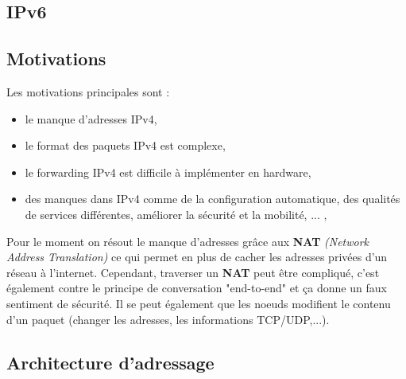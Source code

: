 \documentclass{article}
\begin{document}
\begin{sffamily}
\section{IPv6}

\subsection{Motivations}

Les motivations principales sont :
\begin{itemize}
\item le manque d'adresses IPv4,
\item le format des paquets IPv4 est complexe,
\item le forwarding IPv4 est difficile à implémenter en hardware,
\item des manques dans IPv4 comme de la configuration automatique, des qualités de services différentes, améliorer la sécurité 
et la mobilité, ... , \\
\end{itemize}

\noindent Pour le moment on résout le manque d'adresses grâce aux \textbf{NAT} \textit{(Network Address Translation)} ce qui 
permet en plus de cacher les adresses privées d'un réseau à l'internet. Cependant, traverser un \textbf{NAT} peut être 
compliqué, c'est également contre le principe de conversation "end-to-end" et ça donne un faux sentiment de sécurité. Il se peut 
également que les noeuds modifient le contenu d'un paquet (changer les adresses, les informations TCP/UDP,...).

\subsection{Architecture d'adressage}


\end{sffamily}
\end{document}
